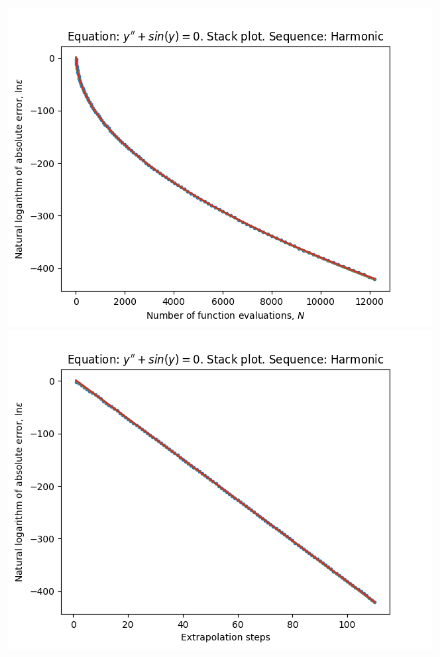 \begin{figure}[H]
\centering
\begin{minipage}{0.45\textwidth}
\centering
\includegraphics[scale=0.45]{../results/emr_plots/oscillation_hp_harmonic_stack.png}
\end{minipage}
\begin{minipage}{0.45\textwidth}
\centering
\includegraphics[scale=0.45]{../results/emr_plots/oscillation_hp_harmonic_steps_stack.png}
\end{minipage}
\end{figure}


